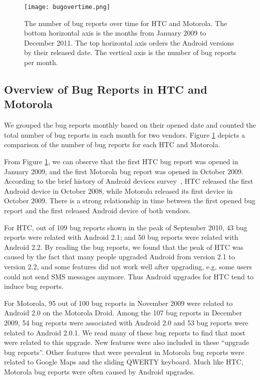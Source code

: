 \documentclass[10pt, conference, compsocconf]{IEEEtran}
\begin{document}
\begin{figure}
\centering
\texttt{[image: bugovertime.png]}
\caption{The number of bug reports over time for HTC and Motorola. The
  bottom
  horizontal axis is the months from January 2009 to December 2011. The top
  horizontal axis orders the Android versions by their released
  date. The vertical axis is the number of bug reports per month.}
\label{bugovertime}
\end{figure}

\subsection{Overview of Bug Reports in HTC and Motorola}

We grouped the bug reports monthly based on their opened date and
counted the total number of bug reports in each month for two
vendors. 
Figure \ref{bugovertime} depicts a comparison of the number
of bug reports for each HTC and Motorola.


From Figure \ref{bugovertime}, we can observe that the first HTC bug
report was opened in January 2009, and the first Motorola bug report
was opened in October 2009.
According to the brief history of Android devices
survey~\cite{historyofandroid}, HTC released the first Android device
in October 2008, while Motorola released its first device in October 2009.
There is a strong relationship in time between the first
opened bug report and the first released Android device of both
vendors.


For HTC, out of 109 bug reports shown in the peak of September 2010, 43 bug reports
were related with Android 2.1;
 and 50 bug reports were related with Android 2.2. 
By reading the bug reports, we found that the peak of HTC was caused
by the fact that many people upgraded Android from version 2.1 to
version 2.2,
and some features did not work well after upgrading, e.g, some users
could not send SMS messages anymore.
Thus Android upgrades for HTC tend to induce bug reports.


For Motorola,  95 out of 100 bug
reports in November 2009 were related to Android 2.0 on the Motorola Droid.
Among the 107 bug reports in December 2009, 54 bug reports were
associated with Android 2.0 and 53 bug reports were related to Android
2.0.1. 
We read many of these bug reports to find that most were related to this upgrade.
New features were also included in these ``upgrade bug reports''.
Other features that were prevalent in Motorola bug reports were
related to Google Maps and the sliding QWERTY keyboard. 
Much like HTC, Motorola bug reports were often caused by Android upgrades.
\end{document}
